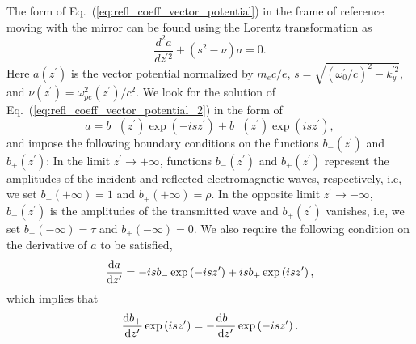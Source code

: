 \documentclass[10pt, a4paper, twoside, openright]{report}
\begin{document}
The form of Eq.~(\ref{eq:refl_coeff_vector_potential}) in the frame of reference moving with the mirror can be found using the Lorentz transformation as \cite{Panchenko2008, Bulanov2013}
\begin{equation}\label{eq:refl_coeff_vector_potential_2}
\frac{d^2 a}{d z^{\prime 2}}+ \left( s^2 - \nu \right) a = 0.
\end{equation}
Here $ a \left( z^{\prime} \right) $ is the vector potential normalized by $ m_e c / e $, $ s = \sqrt{ \left( \omega_0^{\prime} / c \right)^2 - k_y^{\prime 2}} $, and $ \nu \left( z^{\prime} \right) = \omega_{pe}^2\left( z^{\prime} \right) / c^2 $. We look for the solution of Eq.~(\ref{eq:refl_coeff_vector_potential_2}) in the form of
\begin{equation}\label{eq:vector_potential_form}
a = b_{-} \left( z^{\prime} \right) \exp \left( -i s z^{\prime} \right) + b_{+} \left( z^{\prime} \right) \exp \left( i s z^{\prime} \right),
\end{equation}
and impose the following boundary conditions on the functions $ b_{-} \left( z^{\prime} \right) $ and $ b_{+} \left( z^{\prime} \right) $: In the limit $ z^{\prime} \rightarrow +\infty $, functions $ b_{-} \left( z^{\prime} \right) $ and $ b_{+} \left( z^{\prime} \right) $ represent the amplitudes of the incident and reflected electromagnetic waves, respectively, i.e, we set $ b_{-} \left( +\infty \right) = 1 $ and $ b_{+} \left( +\infty \right) = \rho $. In the opposite limit $ z^{\prime} \rightarrow -\infty $, $ b_{-} \left( z^{\prime} \right) $ is the amplitudes of the transmitted wave and $ b_{+} \left( z^{\prime} \right) $ vanishes, i.e, we set $ b_{-} \left( -\infty \right) = \tau $ and $ b_{+} \left( -\infty \right) = 0 $. We also require the following condition on the derivative of $ a $ to be satisfied,
\begin{equation}\label{eq:boundary_condition_1}
\diff{a}{z^{\prime}} = -i s b_{-} \exp \left( -i s z^{\prime} \right) + i s b_{+} \exp \left( i s z^{\prime} \right),
\end{equation}
which implies that
\begin{equation}\label{eq:boundary_condition_2}
\diff{b_{+}}{z^{\prime}} \exp \left( i s z^{\prime} \right) = -\diff{b_{-}}{z^{\prime}} \exp \left( -i s z^{\prime} \right).
\end{equation}
\end{document}
